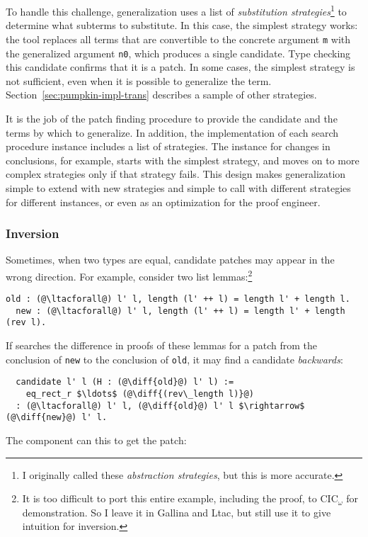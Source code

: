 To handle this challenge, generalization uses a list of \textit{substitution strategies}\footnote{I originally called these \textit{abstraction strategies}, but this is more accurate.}
to determine what subterms to substitute.
In this case, the simplest strategy works: the tool
replaces all terms that are convertible to the concrete argument \lstinline{m} with the generalized argument
\lstinline{n0}, which produces a single candidate. Type checking this candidate confirms that it is a patch.
In some cases, the simplest strategy is not sufficient, even when it is possible to generalize the term.
Section~\ref{sec:pumpkin-impl-trans} describes a sample of other strategies.

It is the job of the patch finding procedure to provide the candidate and the terms by which to generalize.
In addition, the implementation of each search procedure instance includes a list of strategies.
The instance for changes in conclusions, for example, starts with the simplest strategy,
and moves on to more complex strategies only if that strategy fails.
This design makes generalization simple to extend with new strategies and simple to call with different strategies
for different instances, or even as an optimization for the proof engineer.

\subsubsection*{Inversion} Sometimes, when two types are  equal,
candidate patches may appear in the wrong direction.
For example, consider two list lemmas:\footnote{It is too difficult to port this entire example, including the proof, to CIC$_{\omega}$ for demonstration.
So I leave it in Gallina and Ltac, but still use it to give intuition for inversion.}

\begin{lstlisting}[language=coq]
  old : (@\ltacforall@) l' l, length (l' ++ l) = length l' + length l.
  new : (@\ltacforall@) l' l, length (l' ++ l) = length l' + length (rev l).
\end{lstlisting} 
If \sysname searches the difference in proofs of these lemmas for a patch from the 
conclusion of \lstinline{new} to the conclusion of \lstinline{old},
it may find a candidate \emph{backwards}:

\begin{lstlisting}
  candidate l' l (H : (@\diff{old}@) l' l) :=
    eq_rect_r $\ldots$ (@\diff{(rev\_length l)}@)
  : (@\ltacforall@) l' l, (@\diff{old}@) l' l $\rightarrow$ (@\diff{new}@) l' l.
\end{lstlisting}
The component can  this to get the patch: %

